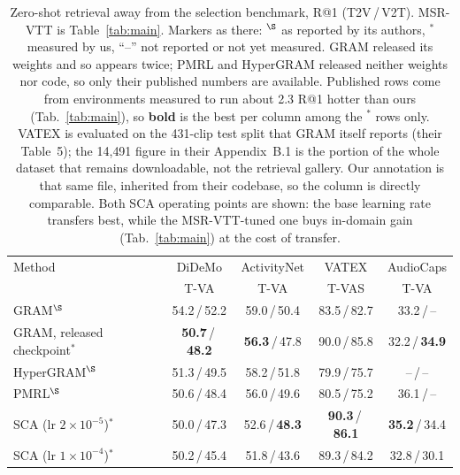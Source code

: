 \begin{table}[t]
\centering
\caption{Zero-shot retrieval away from the selection benchmark, R@1 (T2V\,/\,V2T). MSR-VTT
is Table~\ref{tab:main}. Markers as there: $^{\S}$ as reported by its authors, $^{\ast}$
measured by us, ``--'' not reported or not yet measured. GRAM released its weights and so
appears twice; PMRL and HyperGRAM released neither weights nor code, so only their published
numbers are available. Published rows come from environments measured to run about 2.3 R@1
hotter than ours (Tab.~\ref{tab:main}), so \textbf{bold} is the best per column among the
$^{\ast}$ rows only. VATEX is evaluated on the 431-clip test split that GRAM
itself reports (their Table~5); the 14{,}491 figure in their Appendix~B.1 is the portion of
the whole dataset that remains downloadable, not the retrieval gallery. Our annotation is
that same file, inherited from their codebase, so the column is directly comparable.
Both SCA operating points are shown: the base learning rate transfers best, while the
MSR-VTT-tuned one buys in-domain gain (Tab.~\ref{tab:main}) at the cost of transfer.}
\label{tab:zs_all}
\small
\setlength{\tabcolsep}{6pt}
\begin{tabular}{lcccc}
\toprule
Method & DiDeMo & ActivityNet & VATEX & AudioCaps \\
 & T-VA & T-VA & T-VAS & T-VA \\
\midrule
GRAM$^{\S}$ & 54.2\,/\,52.2 & 59.0\,/\,50.4 & 83.5\,/\,82.7 & 33.2\,/\,-- \\
GRAM, released checkpoint$^{\ast}$ & \textbf{50.7}\,/\,\textbf{48.2} & \textbf{56.3}\,/\,47.8 & 90.0\,/\,85.8 & 32.2\,/\,\textbf{34.9} \\
HyperGRAM$^{\S}$ & 51.3\,/\,49.5 & 58.2\,/\,51.8 & 79.9\,/\,75.7 & --\,/\,-- \\
PMRL$^{\S}$ & 50.6\,/\,48.4 & 56.0\,/\,49.6 & 80.5\,/\,75.2 & 36.1\,/\,-- \\
\midrule
SCA (lr $2{\times}10^{-5}$)$^{\ast}$ & 50.0\,/\,47.3 & 52.6\,/\,\textbf{48.3} & \textbf{90.3}\,/\,\textbf{86.1} & \textbf{35.2}\,/\,34.4 \\
SCA (lr $1{\times}10^{-4}$)$^{\ast}$ & 50.2\,/\,45.4 & 51.8\,/\,43.6 & 89.3\,/\,84.2 & 32.8\,/\,30.1 \\
\bottomrule
\end{tabular}
\end{table}
